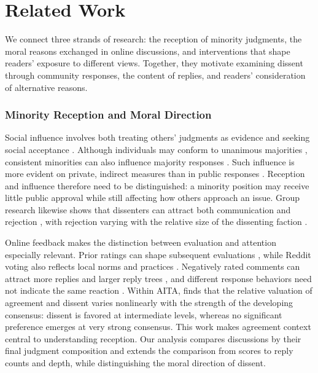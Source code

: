 \section{Related Work}
\label{sec:related-work}

We connect three strands of research: the reception of minority judgments,
the moral reasons exchanged in online discussions, and interventions that
shape readers' exposure to different views. Together, they motivate
examining dissent through community responses, the content of replies,
and readers' consideration of alternative reasons.

\subsubsection*{Minority Reception and Moral Direction}
Social influence involves both treating others' judgments as evidence and
seeking social acceptance \cite{deutsch1955normative}. Although individuals
may conform to unanimous majorities \cite{asch1956independence}, consistent
minorities can also influence majority responses
\cite{moscovici1969minority}. Such influence is more evident on private,
indirect measures than in public responses \cite{wood1994minority}.
Reception and influence therefore need to be distinguished: a minority
position may receive little public approval while still affecting how
others approach an issue. Group research likewise shows that dissenters
can attract both communication and rejection
\cite{schachter1951deviation,wesselmann2014revisiting}, with rejection
varying with the relative size of the dissenting faction
\cite{tata1996proportionate}.

Online feedback makes the distinction between evaluation and attention
especially relevant. Prior ratings can shape subsequent evaluations
\cite{muchnik2013social,glenski2017rating}, while Reddit voting also
reflects local norms and practices \cite{graham2021sociomateriality}.
Negatively rated comments can attract more replies and larger reply trees
\cite{davis2021emotional}, and different response behaviors need not
indicate the same reaction \cite{kalch2017replying}. Within AITA,
\citet{mellody2025consensus} finds that the relative valuation of agreement
and dissent varies nonlinearly with the strength of the developing
consensus: dissent is favored at intermediate levels, whereas no
significant preference emerges at very strong consensus. This work makes
agreement context central to understanding reception. Our analysis
compares discussions by their final judgment composition and extends the
comparison from scores to reply counts and depth, while distinguishing
the moral direction of dissent.

